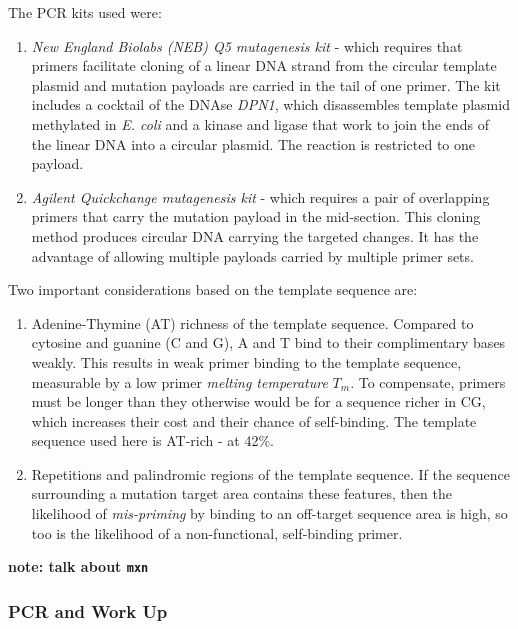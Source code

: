 \documentclass{article}
\begin{document}
The PCR kits used were:

\begin{enumerate}
	\item \textit{New England Biolabs (NEB) Q5 mutagenesis kit} - which requires that primers facilitate cloning of a linear DNA strand from the circular template plasmid and mutation payloads are carried in the tail of one primer.
	The kit includes a cocktail of the DNAse \textit{DPN1}, which disassembles template plasmid methylated in \textit{E. coli} and a kinase and ligase that work to join the ends of the linear DNA into a circular plasmid.
	The reaction is restricted to one payload.

	\item \textit{Agilent Quickchange mutagenesis kit} - which requires a pair of overlapping primers that carry the mutation payload in the mid-section.
	This cloning method produces circular DNA carrying the targeted changes. 
	It has the advantage of allowing multiple payloads carried by multiple primer sets.
\end{enumerate}

Two important considerations based on the template sequence are:

\begin{enumerate}
	\item Adenine-Thymine (AT) richness of the template sequence. Compared to cytosine and guanine (C and G), A and T bind to their complimentary bases weakly.
		This results in weak primer binding to the template sequence, measurable by a low primer \textit{melting temperature} $T_m$.
	To compensate, primers must be longer than they otherwise would be for a sequence richer in CG, which increases their cost and their chance of self-binding.
	The template sequence used here is AT-rich - at 42\%.
	\item Repetitions and palindromic regions of the template sequence. 
		If the sequence surrounding a mutation target area contains these features, then the likelihood of \textit{mis-priming} by binding to an off-target sequence area is high, so too is the likelihood of a non-functional, self-binding primer.
\end{enumerate}

\textbf{note: talk about \texttt{mxn}}

\subsubsection{PCR and Work Up}
\end{document}
